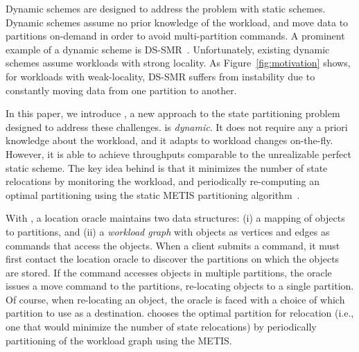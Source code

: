 Dynamic schemes are designed to address the problem with static
schemes.  Dynamic schemes assume no prior knowledge of the workload,
and move data to partitions on-demand in order to avoid
multi-partition commands. A prominent example of a dynamic scheme is
DS-SMR~\cite{long16}. Unfortunately, existing dynamic schemes assume
workloads with strong locality. As Figure~\ref{fig:motivation} shows,
for workloads with weak-locality, DS-SMR suffers from instability due
to constantly moving data from one partition to another.


In this paper, we introduce \dynastar, a new approach to the state
partitioning problem designed to address these challenges.  \dynastar
is \emph{dynamic}. It does not require any a priori knowledge about
the workload, and it adapts to workload changes on-the-fly. However,
it is able to achieve throughputs comparable to the unrealizable
perfect static scheme. The key idea behind \dynastar is that it
minimizes the number of state relocations by monitoring the workload,
and periodically re-computing an optimal partitioning using the static
METIS partitioning algorithm~\cite{Abou-Rjeili:2006}.


With \dynastar, a location oracle maintains two data structures: (i) a
mapping of objects to partitions, and (ii) a \emph{workload graph}
with objects as vertices and edges as commands that access the
objects.  When a client submits a command, it must first contact the
location oracle to discover the partitions on which the objects are
stored.  If the command accesses objects in multiple partitions, the
oracle issues a move command to the partitions, re-locating objects to
a single partition. Of course, when re-locating an object, the oracle
is faced with a choice of which partition to use as a destination.
\dynastar chooses the optimal partition for relocation (i.e., one that
would minimize the number of state relocations) by periodically
partitioning of the workload graph using the METIS.




